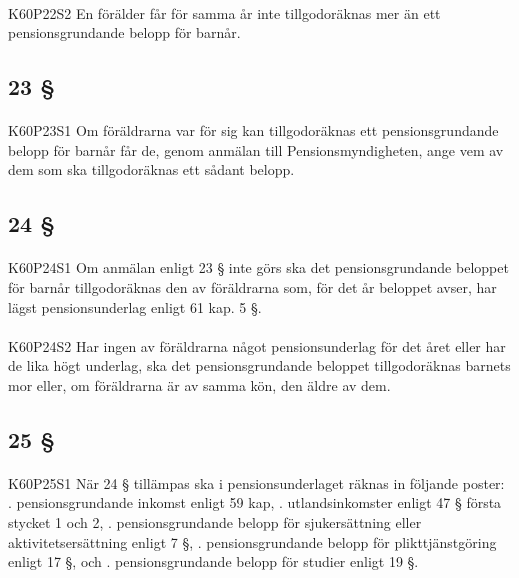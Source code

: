 \documentclass[a4paper,notitlepage,openany,10pt]{book}
\begin{document}
\paragraph*{}
{\tiny K60P22S2}
En förälder får för samma år inte tillgodoräknas mer än ett pensionsgrundande belopp för barnår.
\subsection*{23 §}
\paragraph*{}
{\tiny K60P23S1}
Om föräldrarna var för sig kan tillgodoräknas ett pensionsgrundande belopp för barnår får de, genom anmälan till Pensionsmyndigheten, ange vem av dem som ska tillgodoräknas ett sådant belopp.
\subsection*{24 §}
\paragraph*{}
{\tiny K60P24S1}
Om anmälan enligt 23 § inte görs ska det pensionsgrundande beloppet för barnår tillgodoräknas den av föräldrarna som, för det år beloppet avser, har lägst pensionsunderlag enligt 61 kap. 5 §.
\paragraph*{}
{\tiny K60P24S2}
Har ingen av föräldrarna något pensionsunderlag för det året eller har de lika högt underlag, ska det pensionsgrundande beloppet tillgodoräknas barnets mor eller, om föräldrarna är av samma kön, den äldre av dem.
\subsection*{25 §}
\paragraph*{}
{\tiny K60P25S1}
När 24 § tillämpas ska i pensionsunderlaget räknas in följande poster:
. pensionsgrundande inkomst enligt 59 kap,
. utlandsinkomster enligt 47 § första stycket 1 och 2,
. pensionsgrundande belopp för sjukersättning eller aktivitetsersättning enligt 7 §,
. pensionsgrundande belopp för plikttjänstgöring enligt 17 §, och
. pensionsgrundande belopp för studier enligt 19 §.
\end{document}
